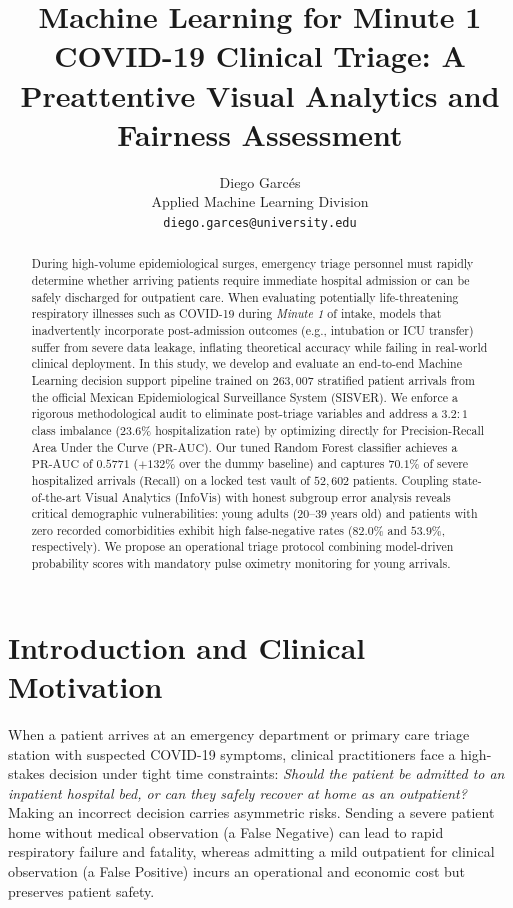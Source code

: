 \documentclass{article}
\title{Machine Learning for Minute 1 COVID-19 Clinical Triage: A Preattentive Visual Analytics and Fairness Assessment}
\author{%
  Diego Garcés \\
  Applied Machine Learning Division\\
  \texttt{diego.garces@university.edu} \\
}
\begin{document}
\maketitle

\begin{abstract}
During high-volume epidemiological surges, emergency triage personnel must rapidly determine whether arriving patients require immediate hospital admission or can be safely discharged for outpatient care. When evaluating potentially life-threatening respiratory illnesses such as COVID-19 during \emph{Minute 1} of intake, models that inadvertently incorporate post-admission outcomes (e.g., intubation or ICU transfer) suffer from severe data leakage, inflating theoretical accuracy while failing in real-world clinical deployment. In this study, we develop and evaluate an end-to-end Machine Learning decision support pipeline trained on $263,007$ stratified patient arrivals from the official Mexican Epidemiological Surveillance System (SISVER). We enforce a rigorous methodological audit to eliminate post-triage variables and address a $3.2:1$ class imbalance ($23.6\%$ hospitalization rate) by optimizing directly for Precision-Recall Area Under the Curve ($\text{PR-AUC}$). Our tuned Random Forest classifier achieves a $\text{PR-AUC}$ of $0.5771$ ($+132\%$ over the dummy baseline) and captures $70.1\%$ of severe hospitalized arrivals ($\text{Recall}$) on a locked test vault of $52,602$ patients. Coupling state-of-the-art Visual Analytics (InfoVis) with honest subgroup error analysis reveals critical demographic vulnerabilities: young adults ($20\text{--}39$ years old) and patients with zero recorded comorbidities exhibit high false-negative rates ($82.0\%$ and $53.9\%$, respectively). We propose an operational triage protocol combining model-driven probability scores with mandatory pulse oximetry monitoring for young arrivals.
\end{abstract}

\section{Introduction and Clinical Motivation}
\label{sec:introduction}

When a patient arrives at an emergency department or primary care triage station with suspected COVID-19 symptoms, clinical practitioners face a high-stakes decision under tight time constraints: \emph{Should the patient be admitted to an inpatient hospital bed, or can they safely recover at home as an outpatient?} Making an incorrect decision carries asymmetric risks. Sending a severe patient home without medical observation (a False Negative) can lead to rapid respiratory failure and fatality, whereas admitting a mild outpatient for clinical observation (a False Positive) incurs an operational and economic cost but preserves patient safety.
\end{document}
